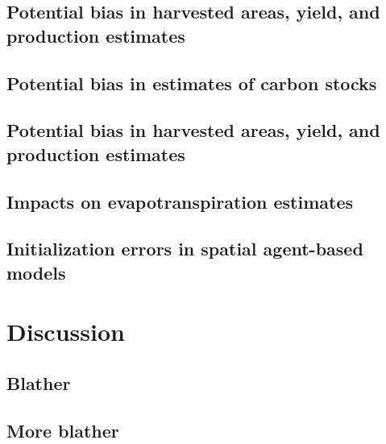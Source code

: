 \documentclass{pnastwo}
\begin{document}
\begin{article}
\subsection{Potential bias in harvested areas, yield, and production estimates}

\subsection{Potential bias in estimates of carbon stocks}

\subsection{Potential bias in harvested areas, yield, and production estimates}

\subsection{Impacts on evapotranspiration estimates}

\subsection{Initialization errors in spatial agent-based models}


\section{Discussion}
\subsection{Blather}


\subsection{More blather}



\end{article}
\end{document}
